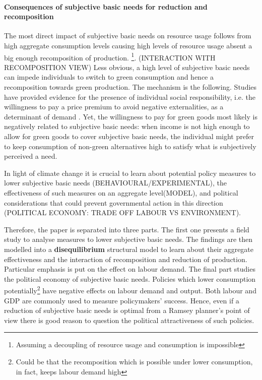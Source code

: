 \documentclass[12pt]{article}
\begin{document}
\paragraph{Consequences of subjective basic needs for reduction and recomposition}
The most direct impact of subjective basic needs on resource usage follows from high aggregate consumption levels causing high levels of resource usage absent a big enough recomposition of production. \footnote{Assuming a decoupling of resource usage and consumption is impossible}. (INTERACTION WITH RECOMPOSITION VIEW) Less obvious, a high level of subjective basic needs can impede individuals to switch to green consumption and hence a recomposition towards green production. The mechanism is the following. Studies have provided evidence for the presence of individual social responsibility, i.e. the willingness to pay a price premium to avoid negative externalities, as a determinant of demand \citep[compare][]{Bartling2015DoResponsibility}. Yet, the willingness to pay for green goods most likely is negatively related to subjective basic needs: when income is not high enough to allow for green goods to cover subjective basic needs, the individual might prefer to keep consumption of non-green alternatives high to satisfy what is subjectively perceived a need. 
  
  
In light of climate change it is crucial to learn about potential policy measures to lower subjective basic needs (BEHAVIOURAL/EXPERIMENTAL), the effectiveness of such measures on an aggregate level(MODEL), and political considerations that could prevent governmental action in this direction (POLITICAL ECONOMY: TRADE OFF LABOUR VS ENVIRONMENT).  

Therefore, the paper is separated into three parts. The first one presents a field study to analyse measures to lower subjective basic needs. The findings are then modelled into a \textbf{disequilibrium} structural model to learn about their aggregate effectiveness and the interaction of recomposition and reduction of production. Particular emphasis is put on the effect on labour demand.
The final part studies the political economy of subjective basic needs. Policies which lower consumption potentially\footnote{ Could be that the recomposition which is possible under lower consumption, in fact, keeps labour demand high} have  negative effects on labour demand and output. Both labour and GDP are commonly used to measure policymakers' success. Hence, even if a reduction of subjective basic needs is optimal from a Ramsey planner's point of view there is good reason to question the political attractiveness of such policies.
\end{document}
